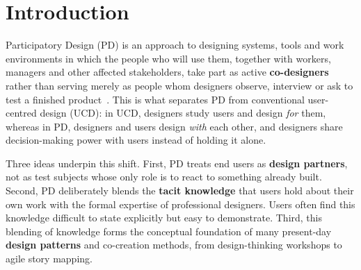 \documentclass[a4paper,12pt]{article}
\begin{document}
\begin{abstract}
Participatory Design (PD) is a design approach in which the people who will use a system take part in designing it as equal partners, rather than serving only as sources of requirements or test subjects. PD grew out of the Scandinavian workplace democracy movement of the 1970s, which aimed to give workers a real voice in the technologies that shaped their jobs. Since then it has spread to software engineering, human--computer interaction, healthcare, education and public services. In this report we introduce the method and trace its history. We then describe its process, from planning and initial exploration of work through discovery, prototyping and evaluation, together with the key techniques used in each stage, such as contextual inquiry, future workshops, card sorting and cooperative prototyping. We also discuss applications of PD in different domains, its benefits, such as better usability, deeper insight into real work and a stronger sense of ownership, and its challenges, such as conflicting needs, limited time, trust and privacy. We show that, when users hold genuine decision-making power, PD produces systems that fit real work practices and that the people who use them truly own.
\end{abstract}


\section{Introduction}
\label{sec:introduction}
Participatory Design (PD) is an approach to designing systems, tools and work environments in which the people who will use them, together with workers, managers and other affected stakeholders, take part as active \textbf{co-designers} rather than serving merely as people whom designers observe, interview or ask to test a finished product~\cite{schuler1993,sanders2008}. This is what separates PD from conventional user-centred design (UCD): in UCD, designers study users and design \emph{for} them, whereas in PD, designers and users design \emph{with} each other, and designers share decision-making power with users instead of holding it alone.

Three ideas underpin this shift. First, PD treats end users as \textbf{design partners}, not as test subjects whose only role is to react to something already built. Second, PD deliberately blends the \textbf{tacit knowledge} that users hold about their own work with the formal expertise of professional designers. Users often find this knowledge difficult to state explicitly but easy to demonstrate. Third, this blending of knowledge forms the conceptual foundation of many present-day \textbf{design patterns} and co-creation methods, from design-thinking workshops to agile story mapping.
\end{document}
